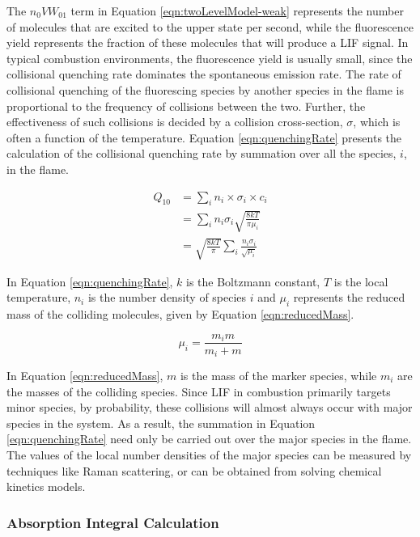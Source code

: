 The \(n_0VW_{01}\) term in Equation \ref{eqn:twoLevelModel-weak} represents the number of molecules that are excited to the upper state per second, while the fluorescence yield represents the fraction of these molecules that will produce a LIF signal.
In typical combustion environments, the fluorescence yield is usually small, since the collisional quenching rate dominates the spontaneous emission rate.
The rate of collisional quenching of the fluorescing species by another species in the flame is proportional to the frequency of collisions between the two.
Further, the effectiveness of such collisions is decided by a collision cross-section, \(\sigma\), which is often a function of the temperature.
Equation \ref{eqn:quenchingRate} presents the calculation of the collisional quenching rate by summation over all the species, \(i\), in the flame.

\begin{align}
  Q_{10} &= \sum_i n_i \times \sigma_i \times c_i \nonumber \\
  & = \sum_i n_i \sigma_i \sqrt{\frac{8kT}{\pi\mu_i}} \nonumber \\
  & = \sqrt{\frac{8kT}{\pi}} \sum_i \frac{n_i \sigma_i}{\sqrt{\mu_i}}
  \label{eqn:quenchingRate}
\end{align}

In Equation \ref{eqn:quenchingRate}, \(k\) is the Boltzmann constant, \(T\) is the local temperature, \(n_i\) is the number density of species \(i\) and \(\mu_i\) represents the reduced mass of the colliding molecules, given by Equation \ref{eqn:reducedMass}.

\begin{equation}
  \mu_i = \frac{ m_i m }{ m_i + m }
  \label{eqn:reducedMass}
\end{equation}

In Equation \ref{eqn:reducedMass}, \(m\) is the mass of the marker species, while \(m_i\) are the masses of the colliding species.
Since LIF in combustion primarily targets minor species, by probability, these collisions will almost always occur with major species in the system.
As a result, the summation in Equation \ref{eqn:quenchingRate} need only be carried out over the major species in the flame.
The values of the local number densities of the major species can be measured by techniques like Raman scattering, or can be obtained from solving chemical kinetics models.

\subsubsection{Absorption Integral Calculation}
\label{subsubsec:basic-model-absorption-integral-calculation}

